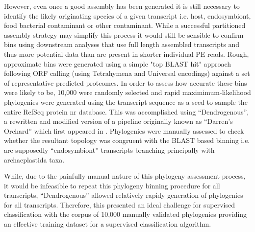 However, even once a good assembly has been generated it is still necessary to identify the likely
originating species of a given transcript i.e. host, endosymbiont, food bacterial contaminant or other
contaminant.  While a successful partitioned assembly strategy may simplify this process it would still
be sensible to confirm bins using downstream analyses that use full length assembled transcripts and thus
more potential data than are present in shorter individual PE reads.  Rough, approximate bins were
generated using a simple "top BLAST hit" approach following ORF calling (using Tetrahymena and Universal
encodings) against a set of representative predicted proteomes.  In order to assess how accurate these
bins were likely to be, 10,000 were randomly selected and rapid maximimum-likelihood phylogenies were
generated using the transcript sequence as a seed to sample the entire RefSeq protein nr database.
This was accomplished using ``Dendrogenous'', a rewritten and modified version of a pipeline originally known 
as ``Darren's Orchard'' which first appeared in \citep{Richards2009g}.  Phylogenies were manually assessed to check
whether the resultant topology was congruent with the BLAST based binning i.e. are supposedly ``endosymbiont''
transcripts branching principally with archaeplastida taxa.  


While, due to the painfully manual nature of this phylogeny assessment process, 
it would be infeasible to repeat this phylogeny binning procedure for all transcripts, ``Dendrogenous'' allowed
relatively rapidy generation of phylogenies for all transcripts.  Therefore, this presented an ideal
challenge for supervised classification with the corpus of 10,000 manually validated phylogenies providing an effective
training dataset for a supervised classification algorithm.  









%
%
